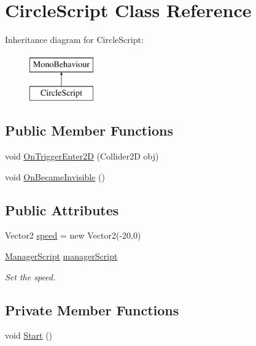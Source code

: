 \hypertarget{class_circle_script}{}\section{Circle\+Script Class Reference}
\label{class_circle_script}
Inheritance diagram for Circle\+Script\+:\begin{figure}[H]
\begin{center}
\leavevmode
\includegraphics[height=2.000000cm]{class_circle_script}
\end{center}
\end{figure}
\subsection*{Public Member Functions}
\begin{DoxyCompactItemize}
\item 
void \hyperlink{class_circle_script_a1d1b1b39ff03be1b31fa855760e2f704}{On\+Trigger\+Enter2\+D} (Collider2\+D obj)
\item 
void \hyperlink{class_circle_script_ac2f21c8ce3074c924eece8d688a5a87f}{On\+Became\+Invisible} ()
\end{DoxyCompactItemize}
\subsection*{Public Attributes}
\begin{DoxyCompactItemize}
\item 
Vector2 \hyperlink{class_circle_script_a4b8a0a38630b44c7e210b8b6be2549c2}{speed} = new Vector2(-\/20,0)
\item 
\hyperlink{class_manager_script}{Manager\+Script} \hyperlink{class_circle_script_ac766a11165e1111c478837fae3df9c19}{manager\+Script}
\begin{DoxyCompactList}\small\item\em Set the speed. \end{DoxyCompactList}\end{DoxyCompactItemize}
\subsection*{Private Member Functions}
\begin{DoxyCompactItemize}
\item 
void \hyperlink{class_circle_script_a79d3a6c4e26f7235eff64bcb1bb8af99}{Start} ()
\end{DoxyCompactItemize}


